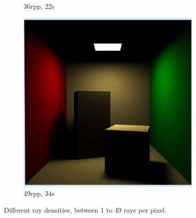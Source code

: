 \begin{figure}[h]
\begin{subfigure}[b]{0.4\textwidth}
		\caption{36rpp, 22s}
	\end{subfigure}
	\begin{subfigure}[b]{0.4\textwidth}
		\includegraphics[width=\textwidth]{week4/arealight_49rpp_34s.png}
		\caption{49rpp, 34s}
	\end{subfigure}
	
	\caption{Different ray densities, between 1 to 49 rays per pixel.}
	\label{fig:cornellrpp}
 \end{figure}
 
